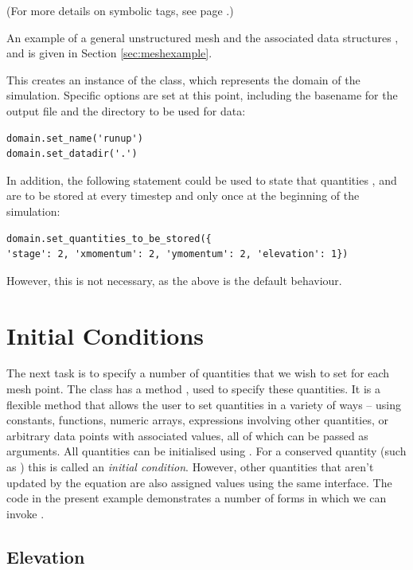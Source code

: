 \documentclass{manual}
\begin{document}
(For more details on symbolic tags, see page
\pageref{ref:tagdescription}.)

An example of a general unstructured mesh and the associated data
structures ,  and  is
given in Section \ref{sec:meshexample}.



This creates an instance of the  class, which
represents the domain of the simulation. Specific options are set at
this point, including the basename for the output file and the
directory to be used for data:

\begin{verbatim}
domain.set_name('runup')
domain.set_datadir('.')
\end{verbatim}

In addition, the following statement could be used to state that
quantities ,  and  are
to be stored at every timestep and  only once at 
the beginning of the simulation:

\begin{verbatim}
domain.set_quantities_to_be_stored({
'stage': 2, 'xmomentum': 2, 'ymomentum': 2, 'elevation': 1})
\end{verbatim}

However, this is not necessary, as the above is the default behaviour.

\section{Initial Conditions}

The next task is to specify a number of quantities that we wish to
set for each mesh point. The class  has a method
, used to specify these quantities. It is a
flexible method that allows the user to set quantities in a variety
of ways -- using constants, functions, numeric arrays, expressions
involving other quantities, or arbitrary data points with associated
values, all of which can be passed as arguments. All quantities can
be initialised using . For a conserved
quantity (such as ) this is called
an \emph{initial condition}. However, other quantities that aren't
updated by the equation are also assigned values using the same
interface. The code in the present example demonstrates a number of
forms in which we can invoke .

\subsection{Elevation}
\end{document}
